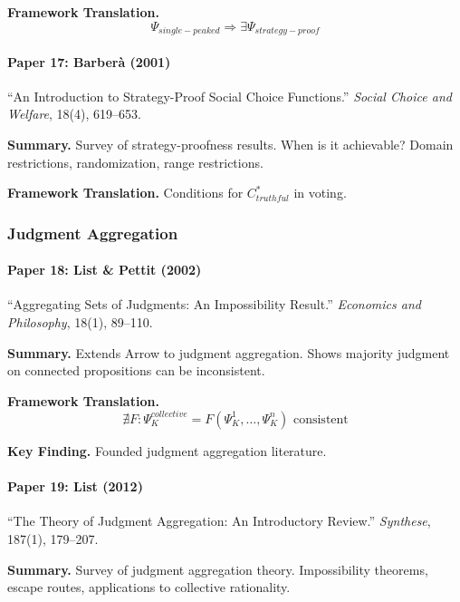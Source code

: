 \textbf{Framework Translation.}
\begin{equation}
\Psi_{single-peaked} \Rightarrow \exists \Psi_{strategy-proof}
\end{equation}

\paragraph{Paper 17: Barberà (2001)}

``An Introduction to Strategy-Proof Social Choice Functions.''
\textit{Social Choice and Welfare}, 18(4), 619--653.

\textbf{Summary.}
Survey of strategy-proofness results. When is it achievable? 
Domain restrictions, randomization, range restrictions.

\textbf{Framework Translation.}
Conditions for $C^*_{truthful}$ in voting.

\subsubsection{Judgment Aggregation}

\paragraph{Paper 18: List \& Pettit (2002)}

``Aggregating Sets of Judgments: An Impossibility Result.''
\textit{Economics and Philosophy}, 18(1), 89--110.

\textbf{Summary.}
Extends Arrow to judgment aggregation. Shows majority judgment 
on connected propositions can be inconsistent.

\textbf{Framework Translation.}
\begin{equation}
\nexists F: \Psi_K^{collective} = F(\Psi_K^1, \ldots, \Psi_K^n) \text{ consistent}
\end{equation}

\textbf{Key Finding.}
Founded judgment aggregation literature.

\paragraph{Paper 19: List (2012)}

``The Theory of Judgment Aggregation: An Introductory Review.''
\textit{Synthese}, 187(1), 179--207.

\textbf{Summary.}
Survey of judgment aggregation theory. Impossibility theorems, 
escape routes, applications to collective rationality.

